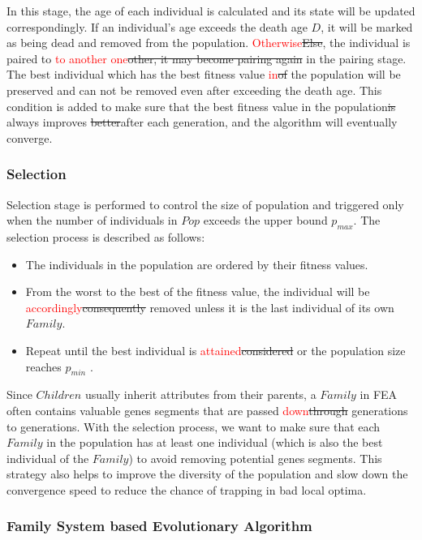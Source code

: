 \documentclass[final]{elsarticle}
\begin{document}
In this stage, the age of each individual is calculated and its state will be updated correspondingly. If an individual's age exceeds the death age $D$, it will be marked as being dead and removed from the population. \textcolor{red}{Otherwise}\sout{Else}, the individual is paired to \textcolor{red}{to another one}\sout{other, it may become pairing again} in the pairing stage. The best individual which has the best fitness value \textcolor{red}{in}\sout{of} the population will be preserved and can not be removed even after exceeding the death age. This condition is added to make sure that the best fitness value in the population\sout{is} always improves \sout{better}after each generation, and the algorithm will eventually converge.

\subsubsection{Selection}

Selection stage is performed to control the size of population and triggered only when the number of individuals in $Pop$ exceeds the upper bound $p_{max}$. The selection process is described as follows: 
\begin{itemize}
	\item The individuals in the population are ordered by their fitness values. 
	\item From the worst to the best of the fitness value, the individual will be \textcolor{red}{accordingly}\sout{consequently} removed unless it is the last individual of its own $ Family $. 
	\item Repeat until the best individual is \textcolor{red}{attained}\sout{considered} or the population size reaches $p_{min}$ .
\end{itemize}
Since $Children$ usually inherit attributes from their parents, a $Family$ in FEA often contains valuable genes segments that are passed \textcolor{red}{down}\sout{through} generations to generations. With the selection process, we want to make sure that each $ Family $ in the population has at least one individual (which is also the best individual of the $ Family $) to avoid removing potential genes segments. This strategy also helps to improve the diversity of the population and slow down the convergence speed to reduce the chance of trapping in bad local optima.

\subsubsection{Family System based Evolutionary Algorithm}
\end{document}
